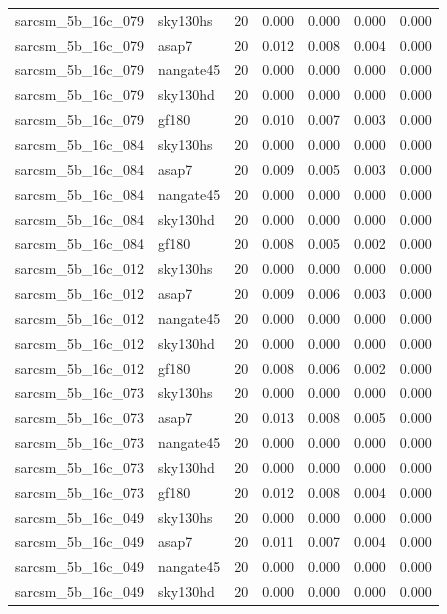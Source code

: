 \begin{tabular}{llrrrrr}
sarcsm\_5b\_16c\_079 & sky130hs & 20 & 0.000 & 0.000 & 0.000 & 0.000 \\
sarcsm\_5b\_16c\_079 & asap7 & 20 & 0.012 & 0.008 & 0.004 & 0.000 \\
sarcsm\_5b\_16c\_079 & nangate45 & 20 & 0.000 & 0.000 & 0.000 & 0.000 \\
sarcsm\_5b\_16c\_079 & sky130hd & 20 & 0.000 & 0.000 & 0.000 & 0.000 \\
sarcsm\_5b\_16c\_079 & gf180 & 20 & 0.010 & 0.007 & 0.003 & 0.000 \\
sarcsm\_5b\_16c\_084 & sky130hs & 20 & 0.000 & 0.000 & 0.000 & 0.000 \\
sarcsm\_5b\_16c\_084 & asap7 & 20 & 0.009 & 0.005 & 0.003 & 0.000 \\
sarcsm\_5b\_16c\_084 & nangate45 & 20 & 0.000 & 0.000 & 0.000 & 0.000 \\
sarcsm\_5b\_16c\_084 & sky130hd & 20 & 0.000 & 0.000 & 0.000 & 0.000 \\
sarcsm\_5b\_16c\_084 & gf180 & 20 & 0.008 & 0.005 & 0.002 & 0.000 \\
sarcsm\_5b\_16c\_012 & sky130hs & 20 & 0.000 & 0.000 & 0.000 & 0.000 \\
sarcsm\_5b\_16c\_012 & asap7 & 20 & 0.009 & 0.006 & 0.003 & 0.000 \\
sarcsm\_5b\_16c\_012 & nangate45 & 20 & 0.000 & 0.000 & 0.000 & 0.000 \\
sarcsm\_5b\_16c\_012 & sky130hd & 20 & 0.000 & 0.000 & 0.000 & 0.000 \\
sarcsm\_5b\_16c\_012 & gf180 & 20 & 0.008 & 0.006 & 0.002 & 0.000 \\
sarcsm\_5b\_16c\_073 & sky130hs & 20 & 0.000 & 0.000 & 0.000 & 0.000 \\
sarcsm\_5b\_16c\_073 & asap7 & 20 & 0.013 & 0.008 & 0.005 & 0.000 \\
sarcsm\_5b\_16c\_073 & nangate45 & 20 & 0.000 & 0.000 & 0.000 & 0.000 \\
sarcsm\_5b\_16c\_073 & sky130hd & 20 & 0.000 & 0.000 & 0.000 & 0.000 \\
sarcsm\_5b\_16c\_073 & gf180 & 20 & 0.012 & 0.008 & 0.004 & 0.000 \\
sarcsm\_5b\_16c\_049 & sky130hs & 20 & 0.000 & 0.000 & 0.000 & 0.000 \\
sarcsm\_5b\_16c\_049 & asap7 & 20 & 0.011 & 0.007 & 0.004 & 0.000 \\
sarcsm\_5b\_16c\_049 & nangate45 & 20 & 0.000 & 0.000 & 0.000 & 0.000 \\
sarcsm\_5b\_16c\_049 & sky130hd & 20 & 0.000 & 0.000 & 0.000 & 0.000 \\

\end{tabular}
